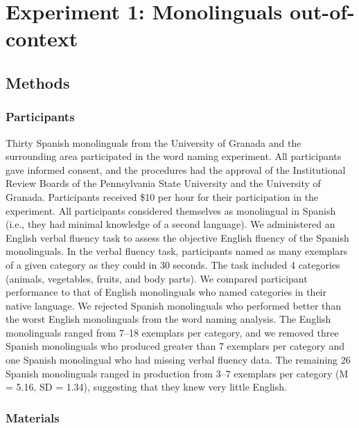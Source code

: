 \section{Experiment 1: Monolinguals out-of-context}
\label{experiment1:monolingualsout-of-context}

\subsection{Methods}
\label{methods}

\subsubsection{Participants}
\label{participants}

Thirty Spanish monolinguals from the University of Granada and the surrounding area participated in the word naming experiment. All participants gave informed consent, and the procedures had the approval of the Institutional Review Boards of the Pennsylvania State University and the University of Granada. Participants received \$10 per hour for their participation in the experiment. All participants considered themselves as monolingual in Spanish (i.e., they had minimal knowledge of a second language). We administered an English verbal fluency task to assess the objective English fluency of the Spanish monolinguals. In the verbal fluency task, participants named as many exemplars of a given category as they could in 30 seconds. The task included 4 categories (animals, vegetables, fruits, and body parts). We compared participant performance to that of English monolinguals who named categories in their native language. We rejected Spanish monolinguals who performed better than the worst English monolinguals from the word naming analysis. The English monolinguals ranged from 7--18 exemplars per category, and we removed three Spanish monolinguals who produced greater than 7 exemplars per category and one Spanish monolingual who had missing verbal fluency data. The remaining 26 Spanish monolinguals ranged in production from 3--7 exemplars per category (M = 5.16, SD = 1.34), suggesting that they knew very little English. 

\subsubsection{Materials}
\label{materials}

